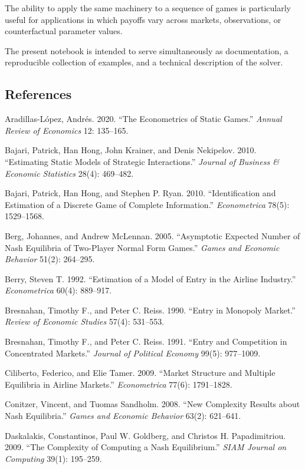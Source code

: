\documentclass[11pt]{article}
\begin{document}
The ability to apply the same machinery to a sequence of games is
particularly useful for applications in which payoffs vary across
markets, observations, or counterfactual parameter values.

The present notebook is intended to serve simultaneously as
documentation, a reproducible collection of examples, and a technical
description of the solver.

    \hypertarget{references}{%
\subsection{References}\label{references}}

Aradillas-López, Andrés. 2020. ``The Econometrics of Static Games.''
\emph{Annual Review of Economics} 12: 135--165.

Bajari, Patrick, Han Hong, John Krainer, and Denis Nekipelov. 2010.
``Estimating Static Models of Strategic Interactions.'' \emph{Journal of
Business \& Economic Statistics} 28(4): 469--482.

Bajari, Patrick, Han Hong, and Stephen P. Ryan. 2010. ``Identification
and Estimation of a Discrete Game of Complete Information.''
\emph{Econometrica} 78(5): 1529--1568.

Berg, Johannes, and Andrew McLennan. 2005. ``Asymptotic Expected Number
of Nash Equilibria of Two-Player Normal Form Games.'' \emph{Games and
Economic Behavior} 51(2): 264--295.

Berry, Steven T. 1992. ``Estimation of a Model of Entry in the Airline
Industry.'' \emph{Econometrica} 60(4): 889--917.

Bresnahan, Timothy F., and Peter C. Reiss. 1990. ``Entry in Monopoly
Market.'' \emph{Review of Economic Studies} 57(4): 531--553.

Bresnahan, Timothy F., and Peter C. Reiss. 1991. ``Entry and Competition
in Concentrated Markets.'' \emph{Journal of Political Economy} 99(5):
977--1009.

Ciliberto, Federico, and Elie Tamer. 2009. ``Market Structure and
Multiple Equilibria in Airline Markets.'' \emph{Econometrica} 77(6):
1791--1828.

Conitzer, Vincent, and Tuomas Sandholm. 2008. ``New Complexity Results
about Nash Equilibria.'' \emph{Games and Economic Behavior} 63(2):
621--641.

Daskalakis, Constantinos, Paul W. Goldberg, and Christos H.
Papadimitriou. 2009. ``The Complexity of Computing a Nash Equilibrium.''
\emph{SIAM Journal on Computing} 39(1): 195--259.
\end{document}

